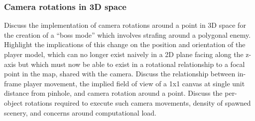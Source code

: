 \documentclass{article}
\begin{document}
\subsubsection*{Camera rotations in 3D space}
Discuss the implementation of camera rotations around a point in 3D space for the
creation of a ``boss mode'' which involves strafing around a polygonal enemy. Highlight
the implications of this change on the position and orientation of the player model,
which can no longer exist naively in a 2D plane facing along the z-axis but which
must now be able to exist in a rotational relationship to a focal point in the map,
shared with the camera. Discuss the relationship between in-frame player movement,
the implied field of view of a 1x1 canvas at single unit distance from pinhole, and
camera rotation around a point. Discuss the per-object rotations required to execute
such camera movements, density of spawned scenery, and concerns around computational
load.
\end{document}
